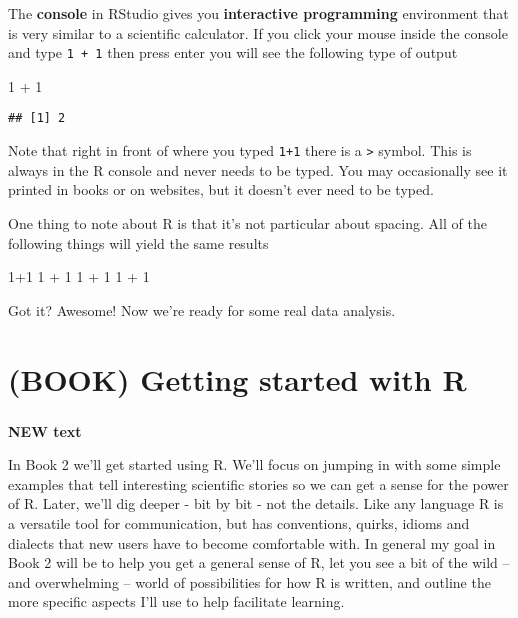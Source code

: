 \documentclass[
]{book}
\newenvironment{Shaded}{\begin{snugshade}}{\end{snugshade}}
\newcommand{\DecValTok}[1]{\textcolor[rgb]{0.00,0.00,0.81}{#1}}
\newcommand{\SpecialCharTok}[1]{\textcolor[rgb]{0.00,0.00,0.00}{#1}}
\begin{document}
The \textbf{console} in RStudio gives you \textbf{interactive programming} environment that is very similar to a scientific calculator. If you click your mouse inside the console and type \texttt{1\ +\ 1} then press enter you will see the following type of output

\begin{Shaded}
\begin{Highlighting}[]
\DecValTok{1} \SpecialCharTok{+} \DecValTok{1}
\end{Highlighting}
\end{Shaded}

\begin{verbatim}
## [1] 2
\end{verbatim}

Note that right in front of where you typed \texttt{1+1} there is a \texttt{\textgreater{}} symbol. This is always in the R console and never needs to be typed. You may occasionally see it printed in books or on websites, but it doesn't ever need to be typed.

One thing to note about R is that it's not particular about spacing. All of the following things will yield the same results

\begin{Shaded}
\begin{Highlighting}[]
\DecValTok{1}\SpecialCharTok{+}\DecValTok{1}
\DecValTok{1} \SpecialCharTok{+} \DecValTok{1}
\DecValTok{1}          \SpecialCharTok{+}        \DecValTok{1}
\DecValTok{1} \SpecialCharTok{+}                                   \DecValTok{1}
\end{Highlighting}
\end{Shaded}

Got it? Awesome! Now we're ready for some real data analysis.

\hypertarget{book-getting-started-with-r}{%
\chapter*{(BOOK) Getting started with R}\label{book-getting-started-with-r}}

\hypertarget{section}{%
\subsection*{}\label{section}}

\textbf{NEW text}

In Book 2 we'll get started using R. We'll focus on jumping in with some simple examples that tell interesting scientific stories so we can get a sense for the power of R. Later, we'll dig deeper - bit by bit - not the details. Like any language R is a versatile tool for communication, but has conventions, quirks, idioms and dialects that new users have to become comfortable with. In general my goal in Book 2 will be to help you get a general sense of R, let you see a bit of the wild -- and overwhelming -- world of possibilities for how R is written, and outline the more specific aspects I'll use to help facilitate learning.
\end{document}
